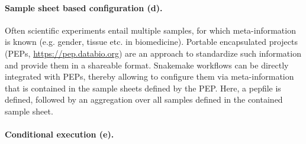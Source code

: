 \documentclass{scrartcl}
\let\plainurl\url
\renewcommand{\url}[1]{\protect\plainurl{#1}}
\begin{document}
\paragraph{Sample sheet based configuration (d).} Often scientific experiments entail multiple samples, for which meta-information is known (e.g. gender, tissue etc. in biomedicine).
Portable encapsulated projects (PEPs, \url{https://pep.databio.org}) are an approach to standardize such information and provide them in a shareable format.
Snakemake workflows can be directly integrated with PEPs, thereby allowing to configure them via meta-information that is contained in the sample sheets defined by the PEP.
Here, a pepfile is defined, followed by an aggregation over all samples defined in the contained sample sheet.

\paragraph{Conditional execution (e).}

\printbibliography
\end{document}
